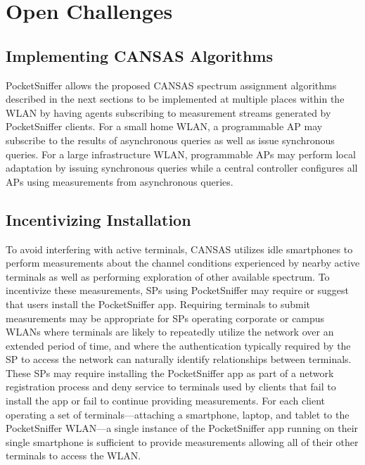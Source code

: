 \section{Open Challenges}
\label{sec-challenges}

\subsection{Implementing CANSAS Algorithms}

PocketSniffer allows the proposed CANSAS spectrum assignment algorithms
described in the next sections to be implemented at multiple places within
the WLAN by having agents subscribing to measurement streams generated by
PocketSniffer clients. For a small home WLAN, a programmable AP may subscribe
to the results of asynchronous queries as well as issue synchronous queries.
For a large infrastructure WLAN, programmable APs may perform local
adaptation by issuing synchronous queries while a central controller
configures all APs using measurements from asynchronous queries.


\subsection{Incentivizing Installation}

To avoid interfering with active terminals, CANSAS utilizes idle smartphones
to perform measurements about the channel conditions experienced by nearby
active terminals as well as performing exploration of other available
spectrum. To incentivize these measurements, SPs using PocketSniffer may
require or suggest that users install the PocketSniffer app. Requiring
terminals to submit measurements may be appropriate for SPs operating
corporate or campus WLANs where terminals are likely to repeatedly utilize
the network over an extended period of time, and where the authentication
typically required by the SP to access the network can naturally identify
relationships between terminals. These SPs may require installing the
PocketSniffer app as part of a network registration process and deny service
to terminals used by clients that fail to install the app or fail to continue
providing measurements. For each client operating a set of
terminals---attaching a smartphone, laptop, and tablet to the PocketSniffer
WLAN---a single instance of the PocketSniffer app running on their single
smartphone is sufficient to provide measurements allowing all of their other
terminals to access the WLAN.

